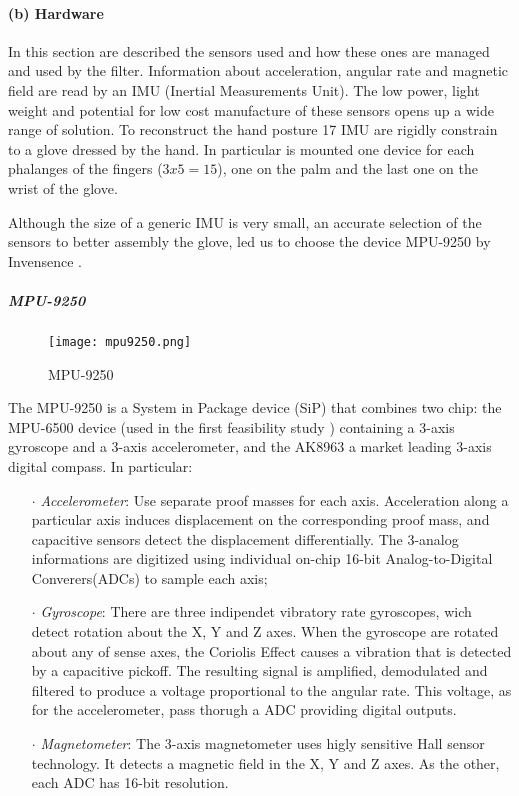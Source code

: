 \paragraph{(b) Hardware}

In this section are described the sensors used and how these ones are managed and used by the filter. Information about acceleration, angular rate and  magnetic field are read by an IMU (Inertial Measurements Unit).  The low power, light weight and potential for low cost manufacture of these sensors opens up a wide range of solution. To reconstruct the hand posture 17 IMU are rigidly constrain to a glove dressed by the hand. In particular is mounted one device for each phalanges of the fingers ($3x5=15$), one on the palm and the last one on the wrist of the glove. 

Although the size of a generic IMU is very small, an accurate selection of the sensors to better assembly the glove, led us to choose the device MPU-9250 by Invensence \cite{riferimento}.  \\

\subparagraph{MPU-9250}

\begin{figure}[h]
\centering
\texttt{[image: mpu9250.png]}
\caption{MPU-9250}
\label{fig:mpu9250}
\end{figure}

The MPU-9250 is a System in Package device (SiP) that combines two chip: the MPU-6500 device (used in the first feasibility study \cite{Santaera:ICRA:2015}) containing a 3-axis gyroscope and a 3-axis accelerometer, and the AK8963  a market leading 3-axis digital compass. In particular:

\begin{itemize}
\item[$\cdot$] \textit{Accelerometer}: Use separate proof masses for each axis. Acceleration along a particular axis induces displacement on the corresponding proof mass, and capacitive sensors detect the displacement differentially. The 3-analog informations are digitized using individual on-chip 16-bit Analog-to-Digital Converers(ADCs) to sample each axis;

 \item[$\cdot$] \textit{Gyroscope}: There are three indipendet vibratory rate gyroscopes, wich detect rotation about the X, Y and Z axes. When the gyroscope are rotated about any of sense axes, the Coriolis Effect causes a vibration that is detected by a capacitive pickoff. The resulting signal is amplified, demodulated and filtered to produce a voltage proportional to the angular rate. This voltage, as for the accelerometer, pass thorugh a ADC providing digital outputs.

 \item[$\cdot$] \textit{Magnetometer}: The 3-axis magnetometer uses higly sensitive Hall sensor technology. It detects a magnetic field in the X, Y and Z axes. As the other, each ADC has 16-bit resolution. 
\end{itemize}

